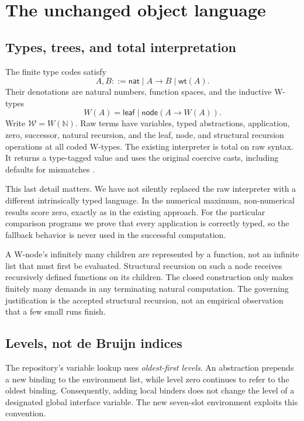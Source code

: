 \documentclass[11pt,letterpaper]{article}
\theoremstyle{definition}
\newcommand{\N}{\mathbb N}
\newcommand{\W}{\mathcal W}
\begin{document}
\section{The unchanged object language}
\label{sec:language}

\subsection{Types, trees, and total interpretation}

The finite type codes satisfy
\[
 A,B ::= \mathsf{nat}\mid A\to B\mid\mathsf{wt}(A).
\]
Their denotations are natural numbers, function spaces, and the inductive
W-types
\[
 W(A)=\mathsf{leaf}\mid\mathsf{node}(A\to W(A)).
\]
Write $\W=W(\N)$. Raw terms have variables, typed abstractions, application,
zero, successor, natural recursion, and the leaf, node, and structural
recursion operations at all coded W-types. The existing interpreter is total
on raw syntax. It returns a type-tagged value and uses the original coercive
casts, including defaults for mismatches \cite{p5-defs}.

This last detail matters. We have not silently replaced the raw interpreter
with a different intrinsically typed language. In the numerical maximum,
non-numerical results score zero, exactly as in the existing approach. For the
particular comparison programs we prove that every application is correctly
typed, so the fallback behavior is never used in the successful computation.

A W-node's infinitely many children are represented by a function, not an
infinite list that must first be evaluated. Structural recursion on such a
node receives recursively defined functions on its children. The closed
construction only makes finitely many demands in any terminating natural
computation. The governing justification is the accepted structural recursion,
not an empirical observation that a few small runs finish.

\subsection{Levels, not de Bruijn indices}

The repository's variable lookup uses \emph{oldest-first levels}. An
abstraction prepends a new binding to the environment list, while level zero
continues to refer to the oldest binding. Consequently, adding local binders
does not change the level of a designated global interface variable.
The new seven-slot environment exploits this convention.
\end{document}
